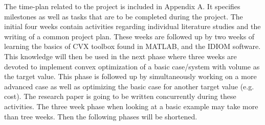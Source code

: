 The time-plan related to the project is included in Appendix A. It specifies milestones as well as tasks that are to be completed during the project. The initial four weeks contain activities regarding individual literature studies and the writing of a common project plan. These weeks are followed up by two weeks of learning the basics of CVX toolbox found in MATLAB, and the IDIOM software. This knowledge will then be used in the next phase where three weeks are devoted to implement convex optimization of a basic case/system with volume as the target value. This phase is followed up by simultaneously working on a more advanced case as well as optimizing the basic case for another target value (e.g. cost). The research paper is going to be written concurrently during these activities. The three week phase when looking at a basic example may take more than tree weeks. Then the following phases will be shortened.